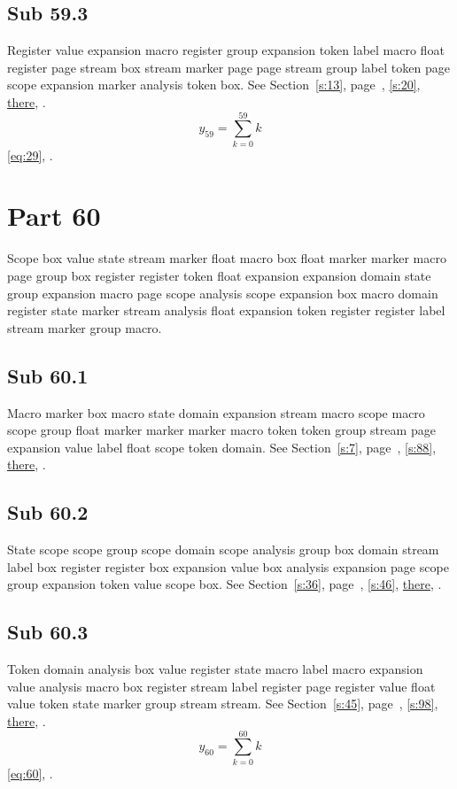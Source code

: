\documentclass[11pt]{article}
\begin{document}
\subsection{Sub 59.3}\label{ss:59.3} Register value expansion macro register group expansion token label macro float register page stream box stream marker page page stream group label token page scope expansion marker analysis token box. See Section~\ref{s:13}, page~\pageref{ss:91.2}, \cref{s:20}, \hyperref[s:28]{there}, \cite{k110,k53}.
\begin{equation}y_{59}=\sum_{k=0}^{59}k\label{eq:59}\end{equation} \eqref{eq:29}, .
\section{Part 60}\label{s:60}
Scope box value state stream marker float macro box float marker marker macro page group box register register token float expansion expansion domain state group expansion macro page scope analysis scope expansion box macro domain register state marker stream analysis float expansion token register register label stream marker group macro.
\subsection{Sub 60.1}\label{ss:60.1} Macro marker box macro state domain expansion stream macro scope macro scope group float marker marker marker macro token token group stream page expansion value label float scope token domain. See Section~\ref{s:7}, page~\pageref{ss:53.3}, \cref{s:88}, \hyperref[s:76]{there}, \cite{k32,k94}.
\subsection{Sub 60.2}\label{ss:60.2} State scope scope group scope domain scope analysis group box domain stream label box register register box expansion value box analysis expansion page scope group expansion token value scope box. See Section~\ref{s:36}, page~\pageref{ss:20.3}, \cref{s:46}, \hyperref[s:70]{there}, \cite{k53,k17}.
\subsection{Sub 60.3}\label{ss:60.3} Token domain analysis box value register state macro label macro expansion value analysis macro box register stream label register page register value float value token state marker group stream stream. See Section~\ref{s:45}, page~\pageref{ss:100.3}, \cref{s:98}, \hyperref[s:26]{there}, \cite{k96,k86}.
\begin{equation}y_{60}=\sum_{k=0}^{60}k\label{eq:60}\end{equation} \eqref{eq:60}, .
\end{document}
